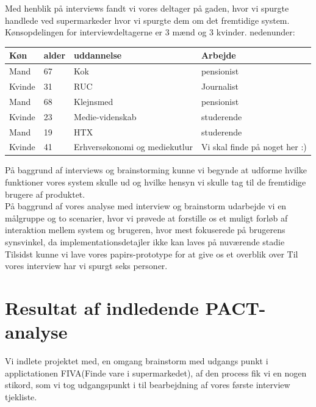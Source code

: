 \documentclass[12pt]{article}
\begin{document}
Med henblik på interviews fandt vi vores deltager på gaden, hvor vi spurgte handlede ved supermarkeder hvor vi spurgte dem om det fremtidige system.\\
Kønsopdelingen for interviewdeltagerne er 3 mænd og 3 kvinder. nedenunder:
\begin{center}
    \begin{tabular}{ | l | l | l | l |}
    \hline
    \textbf{Køn} & \textbf{alder} & \textbf{uddannelse} & \textbf{Arbejde}\\ \hline
    Mand & 67 & Kok & pensionist \\ \hline
    Kvinde & 31 & RUC & Journalist \\ \hline
    Mand & 68 & Klejnsmed & pensionist \\ \hline
    Kvinde & 23 & Medie-videnskab & studerende \\ \hline
    Mand & 19 & HTX & studerende \\ \hline
    Kvinde & 41 & Erhversøkonomi og mediekutlur & Vi skal finde på noget her :) \\ \hline
     \end{tabular}
\end{center}
På baggrund af interviews og brainstorming kunne vi begynde at udforme hvilke funktioner vores system skulle ud og hvilke hensyn vi skulle tag til de fremtidige brugere af produktet.\\
På baggrund af vores analyse med interview og brainstorm udarbejde vi en målgruppe og to scenarier, hvor vi prøvede at forstille os et muligt forløb af interaktion mellem system og brugeren, hvor mest fokuserede på brugerens synsvinkel, da implementationsdetajler ikke kan laves på nuværende stadie\\
Tilsidst kunne vi lave vores papirs-prototype for at give os et overblik over
Til vores interview har vi spurgt seks personer. 
\newpage
\section{Resultat af indledende PACT-analyse}
Vi indlete projektet med, en omgang brainstorm med udgangs punkt i applictationen FIVA(Finde vare i supermarkedet), af den process fik vi 
en nogen stikord, som vi tog udgangspunkt i til bearbejdning af vores f\o rste interview tjekliste.
 
\end{document}
